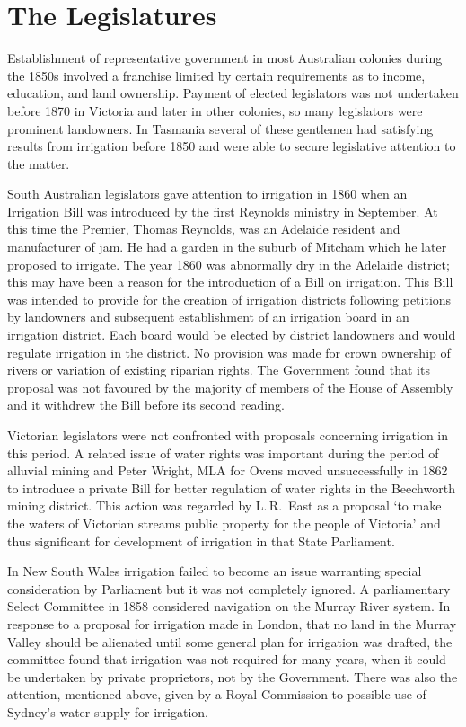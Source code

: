 \section*{The Legislatures}

Establishment of representative government in most Australian colonies
during the 1850s involved a franchise limited by certain requirements
as to income, education, and land ownership.  Payment of elected
legislators was not undertaken before 1870 in Victoria and later in
other colonies, so many legislators were prominent landowners.  In
Tasmania several of these gentlemen had satisfying results from
irrigation before 1850 and were able to secure legislative attention
to the matter.

South Australian legislators gave attention to irrigation in 1860 when
an Irrigation Bill was introduced by the first Reynolds ministry in
September.  At this time the Premier, Thomas Reynolds, was an Adelaide
resident and manufacturer of jam.  He had a garden in the suburb of
Mitcham which he later proposed to irrigate.  The year 1860 was
abnormally dry in the Adelaide district; this may have been a reason
for the introduction of a Bill on irrigation.  This Bill was intended
to provide for the creation of irrigation districts following
petitions by landowners and subsequent establishment of an irrigation
board in an irrigation district. Each board would be elected by
district landowners and would regulate irrigation in the district.  No
provision was made for crown ownership of rivers or variation of
existing riparian rights.  The Government found that its proposal was
not favoured by the majority of members of the House of Assembly and
it withdrew the Bill before its second
reading.

Victorian legislators were not confronted with proposals concerning
irrigation in this period.  A related issue of water rights was
important during the period of alluvial mining and Peter Wright, MLA
for Ovens moved unsuccessfully in 1862 to introduce a private Bill for
better regulation of water rights in the Beechworth mining district.
This action was regarded by L.\,R.~East as a proposal `to make the
waters of Victorian streams public property for the people of
Victoria' and thus significant for development of irrigation in that
State Parliament.

In New South Wales irrigation failed to become an issue warranting
special consideration by Parliament but it was not completely ignored.
A parliamentary Select Committee in 1858 considered navigation on the
Murray River system.  In response to a proposal for irrigation made in
London, that no land in the Murray Valley should be alienated until
some general plan for irrigation was drafted, the committee found that
irrigation was not required for many years, when it could be
undertaken by private proprietors, not by the Government.  There was
also the attention, mentioned above, given by a Royal Commission to
possible use of Sydney's water supply for
irrigation.


